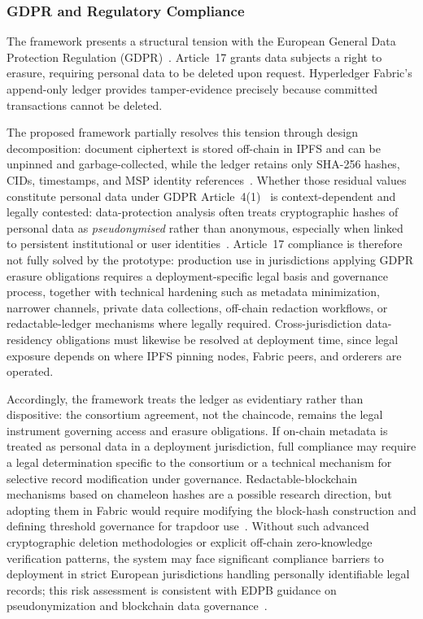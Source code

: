 \documentclass[preprint,12pt]{elsarticle}
\begin{document}
\subsubsection{GDPR and Regulatory Compliance}
\label{sec:gdpr}
The framework presents a structural tension with the European General
Data Protection Regulation (GDPR)~\cite{gdpr2016}. Article~17
grants data subjects a right to erasure, requiring personal data to
be deleted upon request. Hyperledger Fabric's append-only ledger
provides tamper-evidence precisely because committed transactions
cannot be deleted.

The proposed framework partially resolves this tension through design
decomposition: document ciphertext is stored off-chain in IPFS and can
be unpinned and garbage-collected, while the ledger retains only
SHA-256 hashes, CIDs, timestamps, and MSP identity
references~\cite{ipfsDocsQuickstartPin2025,ipfsDocsKuboGarbageCollection}.
Whether those residual values constitute personal data under GDPR
Article~4(1)~\cite{gdpr2016} is context-dependent and legally
contested: data-protection analysis often treats cryptographic hashes
of personal data as \emph{pseudonymised} rather than anonymous,
especially when linked to persistent institutional or user
identities~\cite{finck2019blockchain,politou2019metadata}. Article~17
compliance is therefore not fully solved by the prototype: production
use in jurisdictions applying GDPR erasure obligations requires a
deployment-specific legal basis and governance process, together with
technical hardening such as metadata minimization, narrower channels,
private data collections, off-chain redaction workflows, or
redactable-ledger mechanisms where legally required.
Cross-jurisdiction data-residency obligations must likewise be
resolved at deployment time, since legal exposure depends on where
IPFS pinning nodes, Fabric peers, and orderers are operated.

Accordingly, the framework treats the ledger as evidentiary rather than dispositive: the consortium agreement, not the chaincode, remains the legal instrument governing access and erasure obligations. If on-chain metadata is treated as personal data in a deployment jurisdiction, full compliance may require a legal determination specific to the consortium or a technical mechanism for selective
record modification under governance. Redactable-blockchain mechanisms based on chameleon hashes are a possible research direction, but adopting them in Fabric would require modifying the block-hash construction and defining threshold governance for trapdoor use~\cite{ateniese2017redactable,lyons2018integration}. Without such advanced cryptographic deletion methodologies or explicit off-chain zero-knowledge verification patterns, the system may face significant compliance barriers to deployment in strict European jurisdictions handling personally identifiable legal records; this risk assessment is consistent with EDPB guidance on pseudonymization and blockchain data governance~\cite{EDPB2025Pseudonymisation,Finck2020}.
\end{document}
